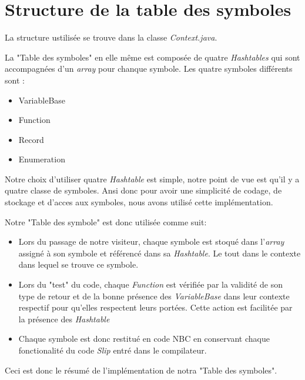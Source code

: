 \section{Structure de la table des symboles}


La structure ustilisée se trouve dans la classe \emph{Context.java}.

La "Table des symboles" en elle même est composée de quatre \emph{Hashtables} qui sont accompagnées d'un \emph{array} pour chanque symbole.
Les quatre symboles différents sont :
\begin{itemize}
    \item VariableBase
    \item Function
    \item Record
    \item Enumeration
\end{itemize}

Notre choix d'utiliser quatre \emph{Hashtable} est simple, notre point de vue est qu'il y a quatre classe de symboles. Ansi donc pour avoir une simplicité de codage, de stockage et
d'acces aux symboles, nous avons utilisé cette implémentation.

Notre "Table des symbole" est donc utilisée comme suit:
\begin{itemize}
    \item Lors du passage de notre visiteur, chaque symbole est stoqué dans l'\emph{array} assigné à son symbole et référencé dans sa \emph{Hashtable}. Le tout dans le contexte dans lequel se trouve ce symbole.
    \item Lors du "test" du code, chaque \emph{Function} est vérifiée par la validité de son type de retour et de la bonne présence des \emph{VariableBase} dans leur contexte respectif pour qu'elles respectent leurs portées. Cette action est facilitée par la présence des \emph{Hashtable}
    \item Chaque symbole est donc restitué en code NBC en conservant chaque fonctionalité du code \emph{Slip} entré dans le compilateur.
\end{itemize}

Ceci est donc le résumé de l'implémentation de notra "Table des symboles".